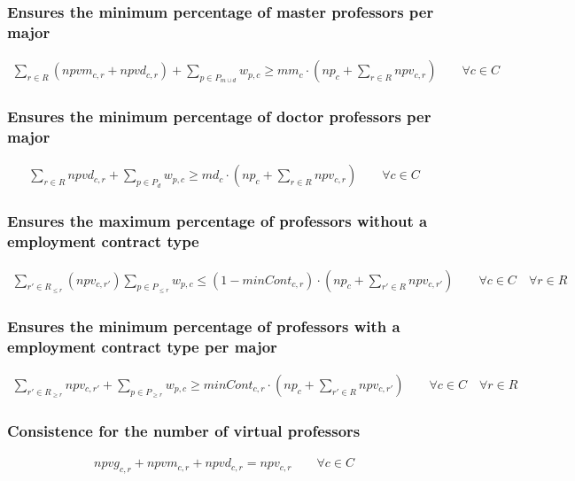 \subsubsection{Ensures the minimum percentage of master professors per major}
\begin{eqnarray}
\sum\limits_{r \in R} (npvm_{c,r} + npvd_{c,r}) + \sum\limits_{p \in P_{m \cup d}} w_{p,c} \ge mm_{c} \cdot (np_{c} + \sum\limits_{r \in R} npv_{c,r}) \nonumber \qquad 
\forall c \in C \quad
\end{eqnarray}

\subsubsection{Ensures the minimum percentage of doctor professors per major}
\begin{eqnarray}
\sum\limits_{r \in R} npvd_{c,r} + \sum\limits_{p \in P_{d}} w_{p,c} \ge md_{c} \cdot (np_{c} + \sum\limits_{r \in R} npv_{c,r}) \nonumber \qquad 
\forall c \in C \quad
\end{eqnarray}

\subsubsection{Ensures the maximum percentage of professors without a employment contract type}
\begin{eqnarray}
\sum\limits_{r' \in R_{\le r}}( npv_{c,r'} ) \sum\limits_{p \in P_{\le r} } w_{p,c} \le (1-minCont_{c,r}) \cdot (np_{c} + \sum\limits_{r' \in R} npv_{c,r'}) \nonumber \qquad 
\forall c \in C \quad
\forall r \in R
\end{eqnarray}

\subsubsection{Ensures the minimum percentage of professors with a employment contract type per major}
\begin{eqnarray}
\sum\limits_{r' \in R_{\ge r}} npv_{c,r'} + \sum\limits_{p \in P_{\ge r}} w_{p,c} \ge minCont_{c,r} \cdot (np_{c} + \sum\limits_{r' \in R} npv_{c,r'}) \nonumber \qquad 
\forall c \in C \quad
\forall r \in R
\end{eqnarray}

\subsubsection{Consistence for the number of virtual professors}
\begin{eqnarray}
npvg_{c,r} + npvm_{c,r} + npvd_{c,r} = npv_{c,r} \nonumber \qquad 
\forall c \in C \quad
\end{eqnarray}

